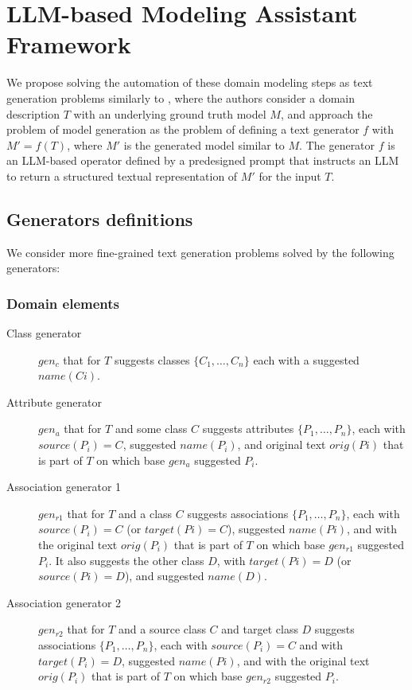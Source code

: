 \chapter{LLM-based Modeling Assistant Framework}

We propose solving the automation of these domain modeling steps as text generation problems similarly to \citet{Chen2023}, where the authors consider a domain description $T$ with an underlying ground truth model $M$, and approach the problem of model generation as the problem of defining a text generator $f$ with $M' = f(T)$, where $M'$ is the generated model similar to $M$. The generator $f$ is an LLM-based operator defined by a predesigned prompt that instructs an LLM to return a structured textual representation of $M'$ for the input $T$.


\section{Generators definitions}

We consider more fine-grained text generation problems solved by the following generators:

\subsection{Domain elements}

\begin{description}
\item [Class generator] $gen_c$ that for $T$ suggests classes $\{C_1, \ldots, C_n\}$ each with a suggested $name(Ci)$.

\item [Attribute generator] $gen_a$ that for $T$ and some class $C$ suggests attributes $\{P_1, \ldots, P_n\}$, each with $source(P_i) = C$, suggested $name(P_i)$, and original text $orig(Pi)$ that is part of $T$ on which base $gen_a$ suggested $P_i$.

\item [Association generator 1] $gen_{r1}$ that for $T$ and a class $C$ suggests associations $\{P_1, \ldots, P_n\}$, each with $source(P_i) = C$ (or $target(Pi) = C$), suggested $name(Pi)$, and with the original text $orig(P_i)$ that is part of $T$ on which base $gen_{r1}$ suggested $P_i$. It also suggests the other class $D$, with $target(Pi)= D$ (or $source(Pi) = D$), and suggested $name(D)$.

\item [Association generator 2] $gen_{r2}$ that for $T$ and a source class $C$ and target class $D$ suggests associations $\{P_1, \ldots, P_n\}$, each with $source(P_i) = C$ and with $target(P_i) = D$, suggested $name(Pi)$, and with the original text $orig(P_i)$ that is part of $T$ on which base $gen_{r2}$ suggested $P_i$.
\end{description}


